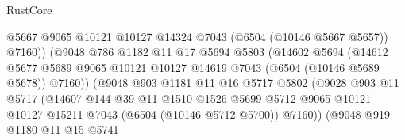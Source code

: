 \begin{lexlean}{RustCore}
\begin{coremodule}
                                    @5667
                                    @9065
                                    @10121
                                    @10127
                                    @14324
                                    @7043
                                    (@6504 (@10146 @5667 @5657))
                                    @7160))
                                (@9048
                                  @786
                                  @1182
                                  @11
                                  @17
                                  @5694
                                  @5803
                                  (@14602
                                    @5694
                                    (@14612
                                      @5677
                                      @5689
                                      @9065
                                      @10121
                                      @10127
                                      @14619
                                      @7043
                                      (@6504 (@10146 @5689 @5678))
                                      @7160))
                                  (@9048
                                    @903
                                    @1181
                                    @11
                                    @16
                                    @5717
                                    @5802
                                    (@9028
                                      @903
                                      @11
                                      @5717
                                      (@14607
                                        @144
                                        @39
                                        @11
                                        @1510
                                        @1526
                                        @5699
                                        @5712
                                        @9065
                                        @10121
                                        @10127
                                        @15211
                                        @7043
                                        (@6504 (@10146 @5712 @5700))
                                        @7160))
                                    (@9048
                                      @919
                                      @1180
                                      @11
                                      @15
                                      @5741

\end{coremodule}
\end{lexlean}
